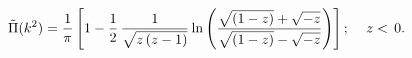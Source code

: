 \begin{equation}
{\tilde{\Pi}}(k^{2})={\frac{1}{\pi }}\left[ 1-\frac{1}{2}\,\frac{1}{\sqrt{%
z\,(z-1)}}\ln \left( {\frac{\sqrt{(1-{z})}+\sqrt{-z}}{\sqrt{(1-{z})}-\sqrt{-z%
}}}\right) \right] ;\,\,\,\,\,\,\,z<\,0.
\end{equation}

